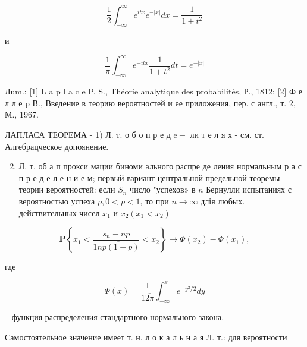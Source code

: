 \documentclass[10pt]{article}
\begin{document}
\[

\frac{1}{2} \int_{-\infty}^{\infty} e^{i t x} e^{-|x|} d x=\frac{1}{1+t^{2}}

\]



и



\[

\frac{1}{\pi} \int_{-\infty}^{\infty} e^{-i t x} \frac{1}{1+t^{2}} d t=e^{-|x|}

\]



Лum.: [1] L a p l a c e P. S., Théorie analytique des probabilités, Р., 1812; [2] Ф е л л е p В., Введение в теорию вероятностей и ее приложения, пер. с англ., т. 2, М., 1967.



ЛАПЛАСА ТЕОРЕМА - 1) Л. т. о б о п р е д $\mathrm{e}-$ ли т е л я х - см. ст. Алгебрацческое допоянение.



\begin{enumerate}

  \setcounter{enumi}{1}

  \item Л. т. об а п прокси мации биноми ального распре де ления нормальным р а с п р е д е л е н и е м; первый вариант центральной предельной теоремы теории вероятностей: если $S_{n}$ число "успехов» в $n$ Бернулли испытаниях с вероятностью успеха $p, 0<p<1$, то при $n \rightarrow \infty$ длія любых. действительных чисел $x_{1}$ и $x_{2}\left(x_{1}<x_{2}\right)$

\end{enumerate}



\[

\mathbf{P}\left\{x_{1}<\frac{s_{n}-n p}{1 \overline{n p(1-p)}}<x_{2}\right\} \rightarrow \Phi\left(x_{2}\right)-\Phi\left(x_{1}\right),

\]



где



\[

\Phi(x)=\frac{1}{1 \overline{2 \pi}} \int_{-\infty}^{x} e^{-y^{2} / 2} d y

\]



-- функция распределения стандартного нормального закона.



Самостоятельное значение имеет т. н. л о к а л ь н а я Л. т.: для вероятности
\end{document}
